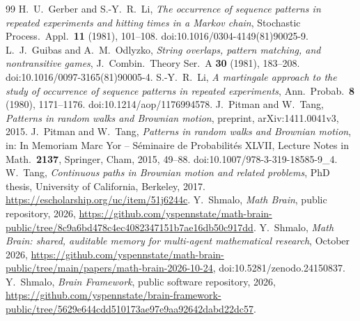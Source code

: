 \documentclass[11pt]{amsart}
\theoremstyle{remark}
\numberwithin{equation}{section}
\begin{document}
\begin{thebibliography}{99}
 H.~U.~Gerber and S.-Y.~R.~Li, \emph{The occurrence of sequence patterns in repeated experiments and hitting times in a Markov chain}, Stochastic Process.\ Appl.\ \textbf{11} (1981), 101--108. doi:10.1016/0304-4149(81)90025-9.
 L.~J.~Guibas and A.~M.~Odlyzko, \emph{String overlaps, pattern matching, and nontransitive games}, J.\ Combin.\ Theory Ser.\ A \textbf{30} (1981), 183--208. doi:10.1016/0097-3165(81)90005-4.
 S.-Y.~R.~Li, \emph{A martingale approach to the study of occurrence of sequence patterns in repeated experiments}, Ann.\ Probab.\ \textbf{8} (1980), 1171--1176. doi:10.1214/aop/1176994578.
 J.~Pitman and W.~Tang, \emph{Patterns in random walks and Brownian motion}, preprint, arXiv:1411.0041v3, 2015.
 J.~Pitman and W.~Tang, \emph{Patterns in random walks and Brownian motion}, in: In Memoriam Marc Yor -- S\'eminaire de Probabilit\'es XLVII, Lecture Notes in Math.\ \textbf{2137}, Springer, Cham, 2015, 49--88. doi:10.1007/978-3-319-18585-9\_4.
 W.~Tang, \emph{Continuous paths in Brownian motion and related problems}, PhD thesis, University of California, Berkeley, 2017. \url{https://escholarship.org/uc/item/51j6244c}.
 Y.~Shmalo, \emph{Math Brain}, public repository, 2026, \url{https://github.com/yspennstate/math-brain-public/tree/8c9a6bd478c4ec4082347151b7ae16db50c917dd}.
 Y.~Shmalo, \emph{Math Brain: shared, auditable memory for multi-agent mathematical research}, October 2026, \url{https://github.com/yspennstate/math-brain-public/tree/main/papers/math-brain-2026-10-24},
doi:10.5281/zenodo.24150837.
 Y.~Shmalo, \emph{Brain Framework}, public software repository, 2026, \url{https://github.com/yspennstate/brain-framework-public/tree/5629e644cdd510173ae97e9aa92642dabd22dc57}.
\end{thebibliography}
\end{document}
